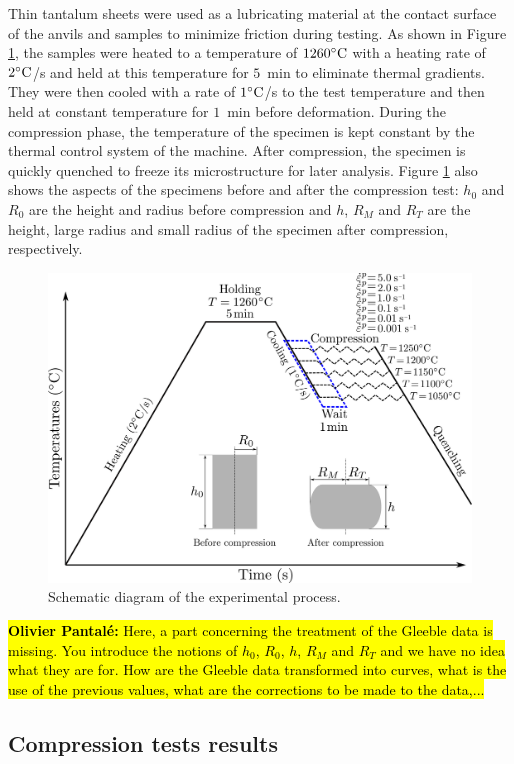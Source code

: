 \documentclass[twoside,english,1p,final,sort&compress]{elsarticle}
\theoremstyle{plain}
\DeclareRobustCommand{\OP}[1]{ {\begingroup\sethlcolor{VWyellow}\textcolor{red}{\hl{\textbf{Olivier Pantal\'e:} #1}}\endgroup} }
\begin{document}
Thin tantalum sheets were used as a lubricating material at the contact surface of the anvils and samples to minimize friction during testing.
As shown in Figure \ref{fig:GleebleProcess}, the samples were heated to a temperature of $1260\celsius$ with a heating rate of $2\celsius$/s and held at this temperature for $5$~min to eliminate thermal gradients.
They were then cooled with a rate of $1\celsius$/s to the test temperature and then held at constant temperature for $1$~min before deformation.
During the compression phase, the temperature of the specimen is kept constant by the thermal control system of the machine.
After compression, the specimen is quickly quenched to freeze its microstructure for later analysis.
Figure \ref{fig:GleebleProcess} also shows the aspects of the specimens before and after the compression test: $h_0$ and $R_0$ are the height and radius before compression and $h$, $R_M$ and $R_T$ are the height, large radius and small radius of the specimen after compression, respectively.
\begin{figure}[!ht]
\centering
\includegraphics[width=0.8\columnwidth]{Figures/GleebleProcess}
\caption{Schematic diagram of the experimental process.}
\label{fig:GleebleProcess}
\end{figure}

\OP{Here, a part concerning the treatment of the Gleeble data is missing. You introduce the notions of $h_0$, $R_0$, $h$, $R_M$ and $R_T$ and we have no idea what they are for. How are the Gleeble data transformed into curves, what is the use of the previous values, what are the corrections to be made to the data,...}
\subsection{Compression tests results}
\end{document}

